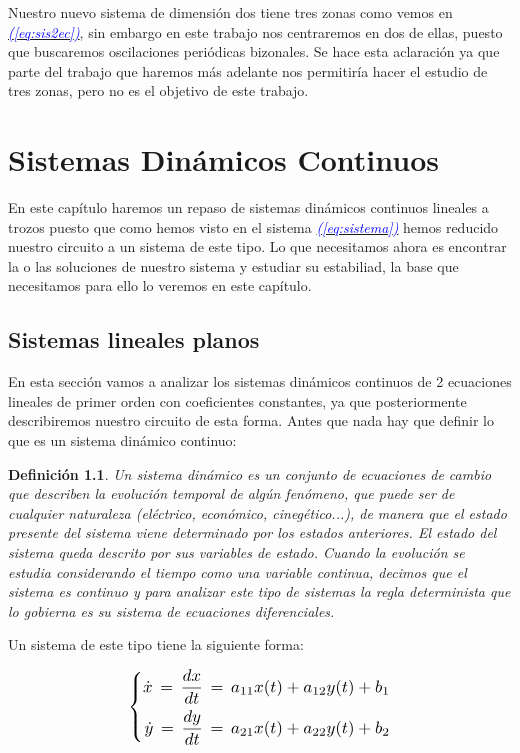 \documentclass[12pt,a4paper]{report} %
\newtheorem{definicion}{Definición}[chapter] %
\newcommand{\eref}[1]{\hyperref[#1]{\textcolor{blue}{\textit{(\ref*{#1})}}}}
\begin{document}
	\vspace{0.5cm}Nuestro nuevo sistema de dimensión dos tiene tres zonas como vemos en \eref{eq:sis2ec}, sin embargo en este trabajo nos centraremos en dos de ellas, puesto que buscaremos oscilaciones periódicas bizonales. Se hace esta aclaración ya que parte del trabajo que haremos más adelante nos permitiría hacer el estudio de tres zonas, pero no es el objetivo de este trabajo.

	
	\chapter{Sistemas Dinámicos Continuos}
	En este capítulo haremos un repaso de sistemas dinámicos continuos lineales a trozos puesto que como hemos visto en el sistema \eref{eq:sistema} hemos reducido nuestro circuito a un sistema de este tipo. Lo que necesitamos ahora es encontrar la o las soluciones de nuestro sistema y estudiar su estabiliad, la base que necesitamos para ello lo veremos en este capítulo.
	\newpage
	\section{Sistemas lineales planos}
	\label{sec:sislinplanos}
	En esta sección vamos a analizar los sistemas dinámicos continuos de 2 ecuaciones lineales de primer orden con coeficientes constantes, ya que posteriormente describiremos nuestro circuito de esta forma.
	Antes que nada hay que definir lo que es un sistema dinámico continuo:
	
	\begin{definicion}
		Un sistema dinámico es un conjunto de ecuaciones de cambio que describen la evolución temporal de algún fenómeno, que puede ser de cualquier naturaleza (eléctrico, económico, cinegético...), de manera que el estado presente del sistema viene determinado por los estados anteriores. El estado del sistema queda descrito por sus variables de estado. Cuando la evolución se estudia considerando el tiempo como una variable 
		continua, decimos que el sistema es continuo y para analizar este tipo de sistemas la regla determinista que lo gobierna es su sistema de ecuaciones diferenciales.
	\end{definicion}
	
	Un sistema de este tipo tiene la siguiente forma:
	
	\begin{equation}
		\label{eq:edo2}
		\scalebox{1.2}{$\displaystyle
			\left\{
			\begin{aligned}
				\dot{x}\,=\,\frac{dx}{dt}\,=\,a_{11}x(t)+a_{12}y(t)+b_1 \\
				\dot{y}\,=\,\frac{dy}{dt}\,=\,a_{21}x(t)+a_{22}y(t)+b_2
			\end{aligned}
			\right.
			$}
	\end{equation}\smallskip
	
\end{document}
